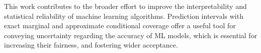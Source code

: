 
This work contributes to the broader effort to improve the interpretability and statistical reliability of machine learning algorithms. Prediction intervals with exact marginal and approximate conditional coverage offer a useful tool for conveying uncertainty regarding the accuracy of ML models, which is essential for increasing their fairness, and fostering wider acceptance.

